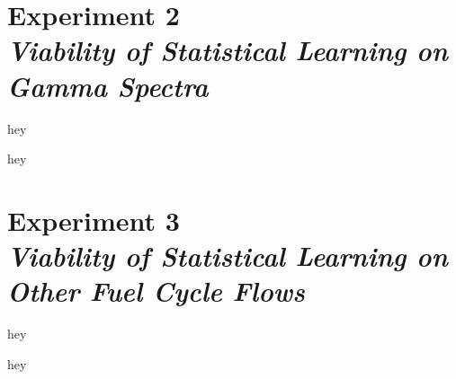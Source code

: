 \section[Experiment 2: Gamma Spectra]{Experiment 2\\ \large{\textit{Viability of Statistical Learning on Gamma Spectra}}}
\label{sec:exp2}

hey

hey

\section[Experiment 3: Other Fuel Cycle Flows]{Experiment 3\\ \large{\textit{Viability of Statistical Learning on Other Fuel Cycle Flows}}}
\label{sec:exp3}

hey 

hey
